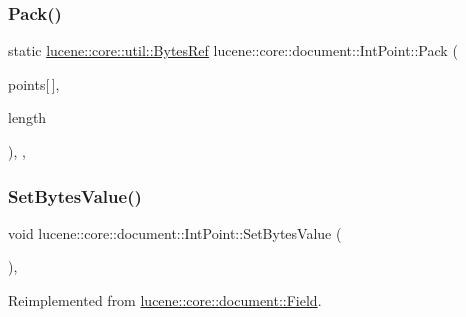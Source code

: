 \subsubsection{\texorpdfstring{Pack()}{Pack()}}
{\footnotesize\ttfamily static \mbox{\hyperlink{classlucene_1_1core_1_1util_1_1BytesRef}{lucene\+::core\+::util\+::\+Bytes\+Ref}} lucene\+::core\+::document\+::\+Int\+Point\+::\+Pack (\begin{DoxyParamCaption}\item[{\mbox{\hyperlink{ZlibCrc32_8h_a2c212835823e3c54a8ab6d95c652660e}{const}} int32\+\_\+t}]{points\mbox{[}$\,$\mbox{]},  }\item[{\mbox{\hyperlink{ZlibCrc32_8h_a2c212835823e3c54a8ab6d95c652660e}{const}} uint32\+\_\+t}]{length }\end{DoxyParamCaption})\hspace{0.3cm}{\ttfamily [inline]}, {\ttfamily [static]}, {\ttfamily [private]}}

\mbox{\label{classlucene_1_1core_1_1document_1_1IntPoint_a288c85e2568bf186de1dac119c91ae2f}} 
\subsubsection{\texorpdfstring{Set\+Bytes\+Value()}{SetBytesValue()}}
{\footnotesize\ttfamily void lucene\+::core\+::document\+::\+Int\+Point\+::\+Set\+Bytes\+Value (\begin{DoxyParamCaption}\item[{\mbox{\hyperlink{ZlibCrc32_8h_a2c212835823e3c54a8ab6d95c652660e}{const}} \mbox{\hyperlink{classlucene_1_1core_1_1util_1_1BytesRef}{lucene\+::core\+::util\+::\+Bytes\+Ref}} \&}]{ }\end{DoxyParamCaption})\hspace{0.3cm}{\ttfamily [inline]}, {\ttfamily [virtual]}}



Reimplemented from \mbox{\hyperlink{classlucene_1_1core_1_1document_1_1Field_a41d077e63ce6fae8677b8df6b29821bd}{lucene\+::core\+::document\+::\+Field}}.

\mbox{\label{classlucene_1_1core_1_1document_1_1IntPoint_a49cd2286ec4ffa46d868eea812d85234}} 
